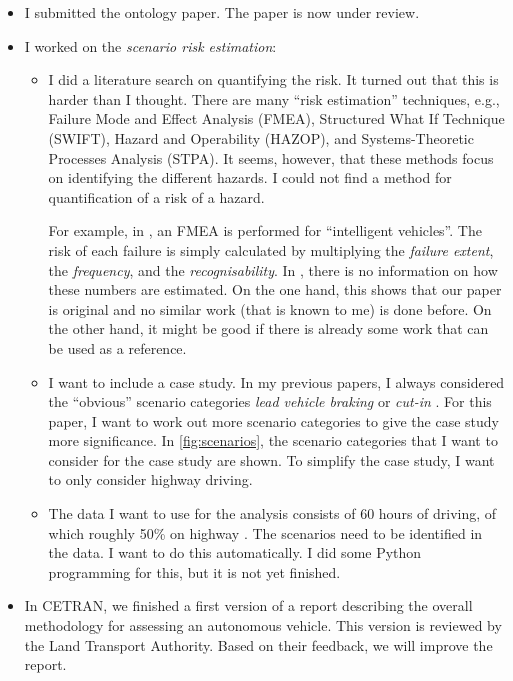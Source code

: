 \documentclass[10pt,final,a4paper,oneside,onecolumn]{article}
\begin{document}
\begin{itemize}
	\item I submitted the ontology paper. The paper is now under review.
	
	\item I worked on the \emph{scenario risk estimation}:
	\begin{itemize}
		\item I did a literature search on quantifying the risk. It turned out that this is harder than I thought. There are many ``risk estimation'' techniques, e.g., Failure Mode and Effect Analysis (FMEA), Structured What If Technique (SWIFT), Hazard and Operability (HAZOP), and Systems-Theoretic Processes Analysis (STPA). It seems, however, that these methods focus on identifying the different hazards. I could not find a method for quantification of a risk of a hazard.
		
		For example, in \cite{tokody2017overview}, an FMEA is performed for ``intelligent vehicles''. The risk of each failure is simply calculated by multiplying the \emph{failure extent}, the \emph{frequency}, and the \emph{recognisability}. In \cite{tokody2017overview}, there is no information on how these numbers are estimated. On the one hand, this shows that our paper is original and no similar work (that is known to me) is done before. On the other hand, it might be good if there is already some work that can be used as a reference.
		
		\item I want to include a case study. In my previous papers, I always considered the ``obvious'' scenario categories \emph{lead vehicle braking} \cite{deGelder2017assessment, degelder2019completeness} or \emph{cut-in} \cite{degelder2019risk}. For this paper, I want to work out more scenario categories to give the case study more significance. In \cref{fig:scenarios}, the scenario categories that I want to consider for the case study are shown. To simplify the case study, I want to only consider highway driving.
		
		\item The data I want to use for the analysis consists of 60 hours of driving, of which roughly 50\% on highway \cite{paardekooper2019dataset6000km}. The scenarios need to be identified in the data. I want to do this automatically. I did some Python programming for this, but it is not yet finished. 
	\end{itemize}

	\item In CETRAN, we finished a first version of a report describing the overall methodology for assessing an autonomous vehicle. This version is reviewed by the Land Transport Authority. Based on their feedback, we will improve the report.
\end{itemize}
\end{document}
